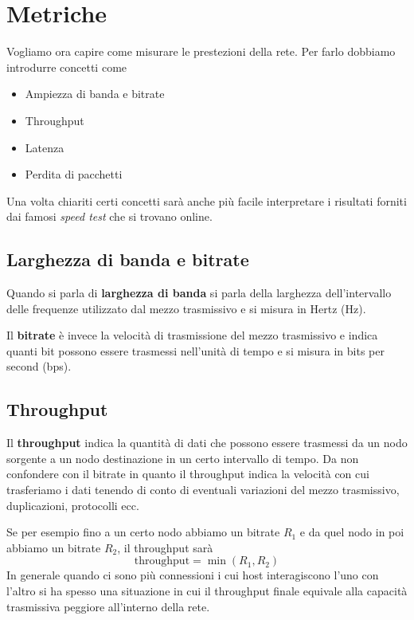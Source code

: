 \section{Metriche}
Vogliamo ora capire come misurare le prestezioni della rete. Per farlo dobbiamo introdurre concetti
come
\begin{itemize}
	\item Ampiezza di banda e bitrate
	\item Throughput
	\item Latenza
	\item Perdita di pacchetti
\end{itemize}
Una volta chiariti certi concetti sarà anche più facile interpretare i risultati forniti dai famosi
\emph{speed test} che si trovano online.

\subsection{Larghezza di banda e bitrate}
Quando si parla di \textbf{larghezza di banda} si parla della larghezza dell'intervallo delle
frequenze utilizzato dal mezzo trasmissivo e si misura in Hertz (Hz).

Il \textbf{bitrate} è invece la velocità di trasmissione del mezzo trasmissivo e indica quanti bit
possono essere trasmessi nell'unità di tempo e si misura in bits per second (bps).

\subsection{Throughput}
Il \textbf{throughput} indica la quantità di dati che possono essere trasmessi da un nodo sorgente
a un nodo destinazione in un certo intervallo di tempo. Da non confondere con il bitrate in quanto
il throughput indica la velocità con cui trasferiamo i dati tenendo di conto di eventuali
variazioni del mezzo trasmissivo, duplicazioni, protocolli ecc.

Se per esempio fino a un certo nodo abbiamo un bitrate $R_1$ e da quel nodo in poi abbiamo un
bitrate $R_2$, il throughput sarà
\[ \text{throughput} = \min (R_1, R_2) \]
In generale quando ci sono più connessioni i cui host interagiscono l'uno con l'altro si ha spesso
una situazione in cui il throughput finale equivale alla capacità trasmissiva peggiore all'interno
della rete.

